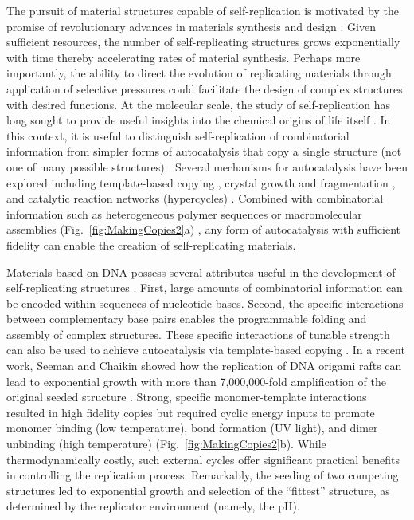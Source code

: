\begin{appendices}
The pursuit of material structures capable of self-replication is motivated by the promise of revolutionary advances in materials synthesis and design \autocite{He2017}. Given sufficient resources, the number of self-replicating structures grows exponentially with time thereby accelerating rates of material synthesis.  Perhaps more importantly, the ability to direct the evolution of replicating materials through application of selective pressures could facilitate the design of complex structures with desired functions.  At the molecular scale, the study of self-replication has long sought to provide useful insights into the chemical origins of life itself \autocite{Orgel1992,ruiz2013prebiotic}. In this context, it is useful to distinguish self-replication of combinatorial information from simpler forms of autocatalysis that copy a single structure (not one of many possible structures) \autocite{schulman2012robust}. Several mechanisms for autocatalysis have been explored including template-based copying \autocite{Wang2011, He2017},  crystal growth and fragmentation \autocite{Viedma2005,carnall2010mechanosensitive}, and catalytic reaction networks (hypercycles) \autocite{Eigen1977, Zeravcic2014}. Combined with combinatorial information such as heterogeneous polymer sequences or macromolecular assemblies (Fig.~\ref{fig:MakingCopies2}a) \autocite{sadownik2016diversification}, any form of autocatalysis with sufficient fidelity \autocite{Eigen1988} can enable the creation of self-replicating materials.

Materials based on DNA \autocite{Jones2015} possess several attributes useful in the development of self-replicating structures \autocite{Wang2011, schulman2012robust, He2017}.  First, large amounts of combinatorial information can be encoded within sequences of nucleotide bases. Second, the specific interactions between complementary base pairs enables the programmable folding and assembly of complex structures.  These specific interactions of tunable strength can also be used to achieve autocatalysis via template-based copying \autocite{Wang2011, He2017}.  In a recent work, Seeman and Chaikin showed how the replication of DNA origami rafts can lead to exponential growth with more than 7,000,000-fold amplification of the original seeded structure \autocite{He2017}.  Strong, specific monomer-template interactions resulted in high fidelity copies but required cyclic energy inputs to promote monomer binding (low temperature), bond formation (UV light), and dimer unbinding (high temperature) (Fig.~\ref{fig:MakingCopies2}b). While thermodynamically costly, such external cycles offer significant practical benefits in controlling the replication process.  Remarkably, the seeding of two competing structures led to exponential growth and selection of the ``fittest'' structure, as determined by the replicator environment (namely, the pH).


\end{appendices}
